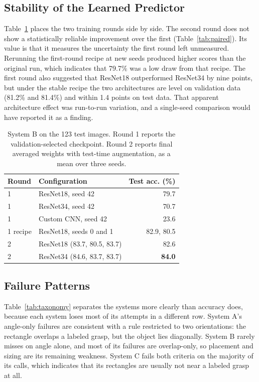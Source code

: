 \documentclass[10pt,conference,compsoc]{IEEEtran}
\begin{document}
\subsection{Stability of the Learned Predictor}

Table~\ref{tab:round2} places the two training rounds side by side. The
second round does not show a statistically reliable improvement over the
first (Table~\ref{tab:paired}). Its value is that it measures the uncertainty
the first round left unmeasured. Rerunning the first-round recipe at new
seeds produced higher scores than the original run, which indicates that
79.7\% was a low draw from that recipe. The first round also suggested that
ResNet18 outperformed ResNet34 by nine points, but under the stable recipe
the two architectures are level on validation data (81.2\% and 81.4\%) and
within 1.4 points on test data. That apparent architecture effect was
run-to-run variation, and a single-seed comparison would have reported it as
a finding.

\begin{table}[t]
\caption{System B on the 123 test images. Round 1 reports the
validation-selected checkpoint. Round 2 reports final averaged weights with
test-time augmentation, as a mean over three seeds.}
\label{tab:round2}
\centering
\footnotesize
\begin{tabular}{llr}
\toprule
Round & Configuration & Test acc. (\%) \\
\midrule
1 & ResNet18, seed 42 & 79.7 \\
1 & ResNet34, seed 42 & 70.7 \\
1 & Custom CNN, seed 42 & 23.6 \\
1 recipe & ResNet18, seeds 0 and 1 & 82.9, 80.5 \\
2 & ResNet18 (83.7, 80.5, 83.7) & 82.6 \\
2 & ResNet34 (84.6, 83.7, 83.7) & \textbf{84.0} \\
\bottomrule
\end{tabular}
\end{table}

\subsection{Failure Patterns}

Table~\ref{tab:taxonomy} separates the systems more clearly than accuracy
does, because each system loses most of its attempts in a different row.
System A's angle-only failures are consistent with a rule restricted to two
orientations: the rectangle overlaps a labeled grasp, but the object lies
diagonally. System B rarely misses on angle alone, and most of its failures
are overlap-only, so placement and sizing are its remaining weakness. System
C fails both criteria on the majority of its calls, which indicates that its
rectangles are usually not near a labeled grasp at all.
\end{document}
